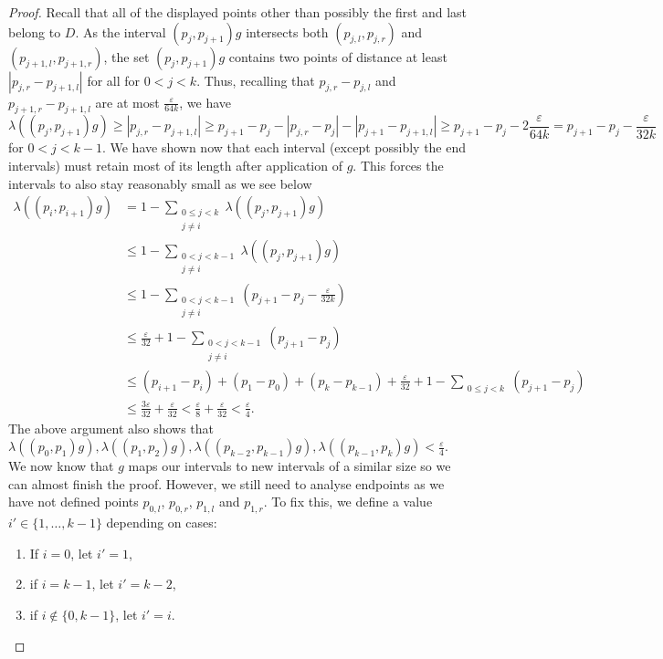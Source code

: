 \documentclass[11pt]{amsart}
\begin{document}
\begin{proof}
Recall that all of the displayed points other than possibly the first and last belong to \(D\).
 As the interval \((p_j, p_{j+1})g\) intersects both \((p_{j,l}, p_{j,r})\) and \((p_{j+1,l}, p_{j+1,r})\), the set  \((p_j, p_{j+1})g\) contains two points of distance at least \(|p_{j,r}- p_{j+1,l}|\) for all for \(0<j<k\). Thus, recalling that $p_{j,r}-p_{j,l}$ and $p_{j+1,r}-p_{j+1,l}$ are at most $\frac{\varepsilon}{64k}$, we have
\[\lambda((p_j, p_{j+1})g) \geq |p_{j,r}- p_{j+1,l}|\geq p_{j+1}- p_{j}-|p_{j,r}-p_j|-|p_{j+1}-p_{j+1,l}| \geq p_{j+1}-p_j - 2\frac{\varepsilon}{64k}=p_{j+1}-p_j - \frac{\varepsilon}{32k}\]
for \(0<j<k-1\). We have shown now that each interval (except possibly the end intervals) must retain most of its length after application of $g$. This forces the intervals to also stay reasonably small as we see below
\begin{align*}
    \lambda((p_i, p_{i+1})g)&= 1-\sum_{\substack{0\leq j<k\\j\neq i}}\lambda((p_j, p_{j+1})g)\\
    &\leq 1-\sum_{\substack{0< j<k-1\\j\neq i}}\lambda((p_j, p_{j+1})g)\\
    &\leq 1-\sum_{\substack{0< j<k-1\\j\neq i}}(p_{j+1}-p_j-\frac{\varepsilon}{32k})\\
    &\leq \frac{\varepsilon}{32}+1-\sum_{\substack{0< j<k-1\\j\neq i}}(p_{j+1}-p_j)\\
    &\leq (p_{i+1}-p_i)+(p_1-p_0)+(p_k-p_{k-1})+\frac{\varepsilon}{32}+1-\sum_{\substack{0\leq j<k}}(p_{j+1}-p_j)\\
    &\leq \frac{3\varepsilon}{32}+\frac{\varepsilon}{32}< \frac{\varepsilon}{8}+\frac{\varepsilon}{32}< \frac{\varepsilon}{4}.
\end{align*}
The above argument also shows that \(\lambda((p_0, p_{1})g),\lambda((p_1, p_{2})g), \lambda((p_{k-2}, p_{k-1})g),\lambda((p_{k-1}, p_{k})g)< \frac{\varepsilon}{4}\). 
We now know that \(g\) maps our intervals to new intervals of a similar size so we can almost finish the proof.
However, we still need to analyse endpoints as we have not defined points \(p_{0,l}\), \(p_{0,r}\), \(p_{1,l}\) and \(p_{1,r}\). To fix this, we define a value \(i'\in \{1,\ldots, k-1\}\) depending on cases:
\begin{enumerate}
    \item If \(i=0\), let \(i'=1\),
    \item if \(i=k-1\), let \(i'=k-2\),
    \item if \(i\notin\{0, k-1\}\), let \(i'=i\).

\end{enumerate}
\end{proof}
\end{document}
